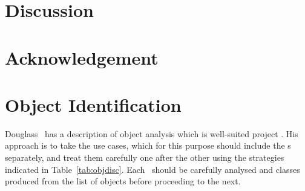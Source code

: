 \documentclass[11pt,twoside,a4paper]{article}
\newcommand{\Tab}[1]{Table~\ref{tab:#1}}
\begin{document}
\section{Discussion}\label{sec:body}

\clearpage
%
\section*{Acknowledgement}\label{sec:ackn}





\clearpage
\appendix
\section{Object Identification}\label{sec:objdisc}
Douglass~\cite[\S\,5]{douglass} has a description of object analysis which is well-suited
project \nep. His approach is to take the use cases, which for this purpose should
include the \papp s separately, and treat them carefully one after the other using
the strategies indicated in \Tab{objdisc}.
Each \papp\ should be carefully analysed and classes produced from the list of objects
before proceeding to the next.

\end{document}
